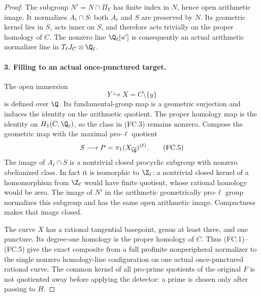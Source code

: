 \begin{proof}
The subgroup $N'=N\cap\Pi_Y$ has finite index in
$N$, hence open arithmetic image. It normalizes
$A_\ell\cap S$: both $A_\ell$ and $S$ are preserved
by $N$. Its geometric kernel lies in $S$, acts
inner on $S$, and therefore acts trivially on
the proper homology of $C$. The nonzero line
$\Q_\ell[u']$ is consequently an actual
arithmetic normalizer line in $T_\ell J_C\otimes\Q_\ell$.

\paragraph{3. Filling to an actual once-punctured target.}
The open immersion
\[
                         Y\hookrightarrow X=C\setminus\{y\}
                                                               \tag{FC.4}
\]
is defined over $\Q$. Its fundamental-group map
is a geometric surjection and induces the
identity on the arithmetic quotient. The
proper homology map is the identity on
$H_1(C,\Q_\ell)$, so the class in (FC.3)
remains nonzero. Compose the geometric map
with the maximal pro-$\ell$ quotient
\[
                     S\longrightarrow
                     P=\pi_1(X_{\overline\Q})^{(\ell)}.
                                                               \tag{FC.5}
\]
The image of $A_\ell\cap S$ is a nontrivial
closed procyclic subgroup with nonzero
abelianized class. In fact it is isomorphic
to $\Z_\ell$: a nontrivial closed kernel of
a homomorphism from $\Z_\ell$ would have
finite quotient, whose rational homology
would be zero. The image of $N'$ in the
arithmetic geometrically pro-$\ell$ group
normalizes this subgroup and has the same
open arithmetic image. Compactness makes
that image closed.

The curve $X$ has a rational tangential
basepoint, genus at least three, and one
puncture. Its degree-one homology is the
proper homology of $C$. Thus (FC.1)--(FC.5)
give the exact composite from a full
profinite nonperipheral normalizer to the
single nonzero homology-line configuration
on one actual once-punctured rational curve.
The common kernel of all pro-prime quotients
of the original $F$ is not quotiented away
before applying the detector: a prime is
chosen only after passing to $H$.


\end{proof}
